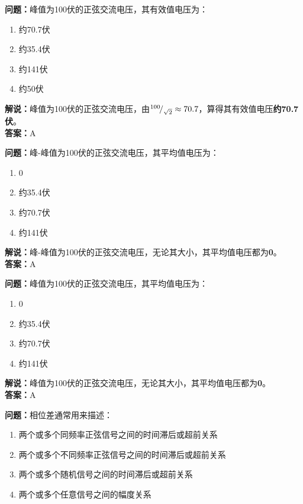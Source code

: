 \textbf{问题：}峰值为100伏的正弦交流电压，其有效值电压为：

\begin{enumerate}[label=\Alph*), leftmargin=1cm]
	\item 约70.7伏
	\item 约35.4伏
	\item 约141伏
	\item 约50伏
\end{enumerate}

\textbf{解说：}峰值为100伏的正弦交流电压，由\({}^{100}\!/_{\sqrt{2}}\approx70.7\)，算得其有效值电压\textbf{约70.7伏}。\\\textbf{答案：}A



\textbf{问题：}峰-峰值为100伏的正弦交流电压，其平均值电压为：

\begin{enumerate}[label=\Alph*), leftmargin=1cm]
	\item 0
	\item 约35.4伏
	\item 约70.7伏
	\item 约141伏
\end{enumerate}

\textbf{解说：}峰-峰值为100伏的正弦交流电压，无论其大小，其平均值电压都为\textbf{0}。\\\textbf{答案：}A



\textbf{问题：}峰值为100伏的正弦交流电压，其平均值电压为：

\begin{enumerate}[label=\Alph*), leftmargin=1cm]
	\item 0
	\item 约35.4伏
	\item 约70.7伏
	\item 约141伏
\end{enumerate}

\textbf{解说：}峰值为100伏的正弦交流电压，无论其大小，其平均值电压都为\textbf{0}。\\\textbf{答案：}A



\textbf{问题：}相位差通常用来描述：

\begin{enumerate}[label=\Alph*), leftmargin=1cm]
	\item 两个或多个同频率正弦信号之间的时间滞后或超前关系
	\item 两个或多个不同频率正弦信号之间的时间滞后或超前关系
	\item 两个或多个随机信号之间的时间滞后或超前关系
	\item 两个或多个任意信号之间的幅度关系
\end{enumerate}


